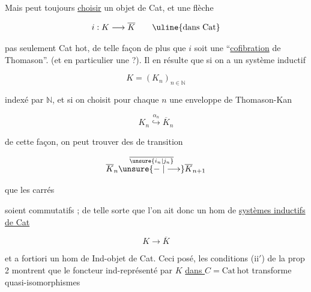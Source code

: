 
Mais  peut toujours \uline{choisir}  un  objet  de Cat, et une flèche

\[
 i:K\longrightarrow\overline K\qquad\text{\uline{dans Cat}}
\]

pas seulement  Cat hot, de telle façon de plus que $i$ soit une ``\uline{cofibration} de Thomason''. (et en particulier une  ?). Il  en résulte que si on a un système inductif

\[
 K=(K_n)_{n\in\mathbb N}
\]

indexé par $\mathbb N$, et si  on choisit pour chaque $n$ une enveloppe de Thomason-Kan

\[
 K_n\overset{\alpha_n}{\hookrightarrow}\overline K_n
\]

de cette façon, on peut trouver des  de transition

\[
 \overline K_n\overset{\overline{\unsure{i_n|j_n}}}{\unsure{\relbar|\longrightarrow}}\overline K_{n+1}
\]

 que les carrés


soient commutatifs ; de telle sorte que l'on ait donc un hom de \uline{systèmes inductifs de Cat}

\[
 K\longrightarrow\overline K
\]

et a fortiori un hom de Ind-objet de Cat. Ceci posé, les conditions  (ii$'$) de la prop 2 montrent que le foncteur ind-représenté par $K$ \uline{dans $C=\mathrm{Cat\,hot}$}  transforme quasi-isomorphismes

